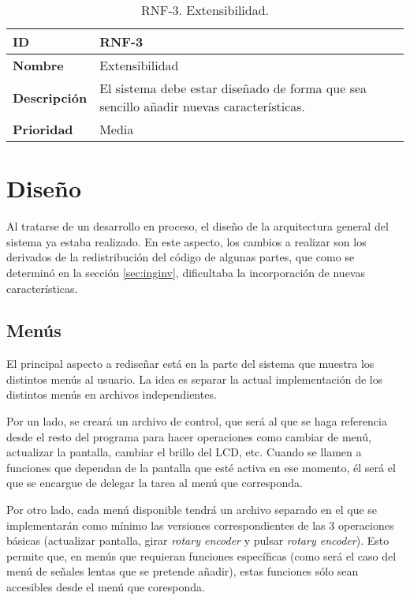 \begin{table}[h!]
    \centering
    \begin{tabular}{|m{2.5cm}|m{9.27cm}|}
        \hline
        \textbf{ID} & RNF-3 \\
        \hline
        \textbf{Nombre} & Extensibilidad \\
        \hline
        \textbf{Descripción} & El sistema debe estar diseñado de forma que sea sencillo añadir nuevas características. \\
        \hline
        \textbf{Prioridad} & Media \\
        \hline
    \end{tabular}
    \caption{RNF-3. Extensibilidad.}
\end{table}

\section{Diseño}
\label{sec:fw_diseño}

Al tratarse de un desarrollo en proceso, el diseño de la arquitectura general del sistema ya estaba realizado. En este aspecto, los cambios a realizar son los derivados de la redistribución del código de algunas partes, que como se determinó en la sección \ref{sec:inginv}, dificultaba la incorporación de nuevas características.

\subsection{Menús}

El principal aspecto a rediseñar está en la parte del sistema que muestra los distintos menús al usuario. La idea es separar la actual implementación de los distintos menús en archivos independientes.

Por un lado, se creará un archivo de control, que será al que se haga referencia desde el resto del programa para hacer operaciones como cambiar de menú, actualizar la pantalla, cambiar el brillo del LCD, etc. Cuando se llamen a funciones que dependan de la pantalla que esté activa en ese momento, él será el que se encargue de delegar la tarea al menú que corresponda.

Por otro lado, cada menú disponible tendrá un archivo separado en el que se implementarán como mínimo las versiones correspondientes de las 3 operaciones básicas (actualizar pantalla, girar \textit{rotary encoder} y pulsar \textit{rotary encoder}). Esto permite que, en menús que requieran funciones específicas (como será el caso del menú de señales lentas que se pretende añadir), estas funciones sólo sean accesibles desde el menú que coresponda.

